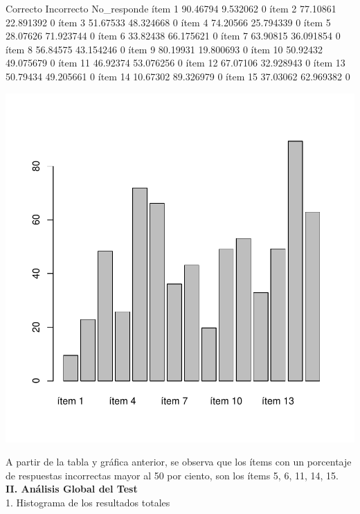 \documentclass{article}
\begin{document}
\begin{Schunk}
\begin{Soutput}
        Correcto Incorrecto No_responde
ítem 1  90.46794   9.532062           0
ítem 2  77.10861  22.891392           0
ítem 3  51.67533  48.324668           0
ítem 4  74.20566  25.794339           0
ítem 5  28.07626  71.923744           0
ítem 6  33.82438  66.175621           0
ítem 7  63.90815  36.091854           0
ítem 8  56.84575  43.154246           0
ítem 9  80.19931  19.800693           0
ítem 10 50.92432  49.075679           0
ítem 11 46.92374  53.076256           0
ítem 12 67.07106  32.928943           0
ítem 13 50.79434  49.205661           0
ítem 14 10.67302  89.326979           0
ítem 15 37.03062  62.969382           0
\end{Soutput}
\end{Schunk}
\includegraphics{Documento_de_prueba-004}

A partir de la tabla y gráfica anterior, se observa que los ítems con un porcentaje de respuestas incorrectas mayor al 50 por ciento, son los ítems 5, 6, 11, 14, 15.\\

\textbf{II.	Análisis Global del Test}\\
1. Histograma de los resultados totales
\end{document}
